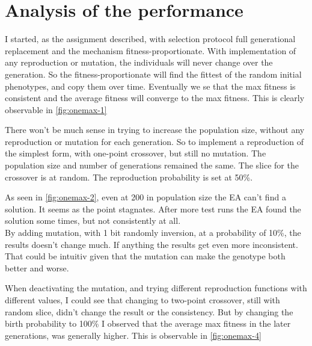 \section{Analysis of the performance}

I started, as the assignment described, with selection protocol full generational replacement and the mechanism
fitness-proportionate. With implementation of any reproduction or mutation, the individuals will never change
over the generation. So the fitness-proportionate will find the fittest of the random initial phenotypes, and copy
them over time. Eventually we se that the max fitness is consistent and the average fitness will converge to the 
max fitness. This is clearly observable in \autoref{fig:onemax-1}


There won't be much sense in trying to increase the population size, without any reproduction or mutation for
each generation. So to implement a reproduction of the simplest form, with one-point crossover, but still no 
mutation. The population size and number of generations remained the same. The slice for the crossover is at
random. The reproduction probability is set at 50\%. 


As seen in \autoref{fig:onemax-2}, even at 200 in population size the EA can't find a solution. It seems as the 
point stagnates. After more test runs the EA found the solution some times, but not consistently at all. \\

By adding mutation, with 1 bit randomly inversion, at a probability of 10\%, the results doesn't change much. 
If anything the results get even more inconsistent. That could be intuitiv given that the mutation can make
the genotype both better and worse. 


When deactivating the mutation, and trying different reproduction functions with different values, I could see
that changing to two-point crossover, still with random slice, didn't change the result or the consistency. But
by changing the birth probability to 100\% I observed that the average max fitness in the later generations,
was generally higher. This is observable in \autoref{fig:onemax-4}

